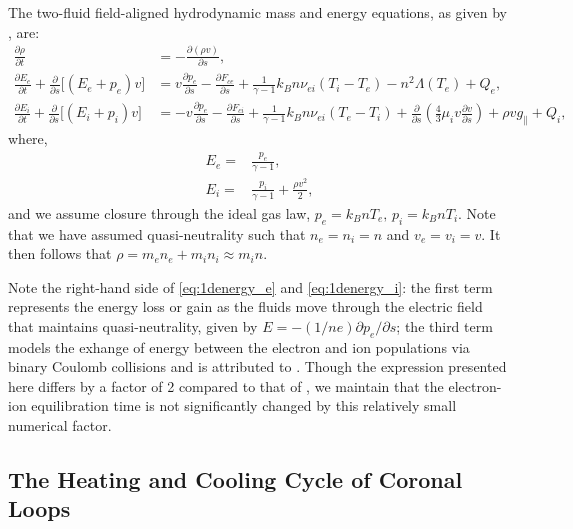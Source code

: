 

The two-fluid field-aligned hydrodynamic mass and energy equations, as given by \citet{bradshaw_influence_2013}, are:
\begin{align}
    \frac{\partial\rho}{\partial t} &= -\frac{\partial(\rho v)}{\partial s}, \label{eq:1dmass} \\
    \frac{\partial E_e}{\partial t} + \frac{\partial}{\partial s} \lbrack(E_e+p_e)v\rbrack &= v\frac{\partial p_e}{\partial s} - \frac{\partial F_{ce}}{\partial s} + \frac{1}{\gamma - 1}k_Bn\nu_{ei}(T_i-T_e) -n^2\Lambda(T_e)+Q_{e} , \label{eq:1denergy_e} \\
    \frac{\partial E_i}{\partial t} + \frac{\partial }{\partial s}\lbrack(E_i+p_i)v\rbrack &= -v\frac{\partial p_e}{\partial s} - \frac{\partial F_{ci}}{\partial s} + \frac{1}{\gamma - 1}k_Bn\nu_{ei}(T_e-T_i) + \frac{\partial}{\partial s}\left(\frac{4}{3}\mu_iv\frac{\partial v}{\partial s}\right) +\rho v g_{\parallel} + Q_{i},\label{eq:1denergy_i}
\end{align}
where,
\begin{align}
    E_e =& \frac{p_e}{\gamma - 1} \label{eq:ee_closure}, \\
    E_i =& \frac{p_i}{\gamma - 1} + \frac{\rho v^2}{2}, \label{eq:ei_closure}
\end{align}
and we assume closure through the ideal gas law, $p_e=k_BnT_e,\,p_i=k_BnT_i$. Note that we have assumed quasi-neutrality such that $n_e=n_i=n$ and $v_e=v_i=v$. It then follows that $\rho=m_en_e+m_in_i\approx m_in$.

Note the right-hand side of \autoref{eq:1denergy_e} and \autoref{eq:1denergy_i}: the first term represents the energy loss or gain as the fluids move through the electric field that maintains quasi-neutrality, given by $E=-(1/ne)\partial p_e/\partial s$; the third term models the exhange of energy between the electron and ion populations via binary Coulomb collisions and is attributed to \citet{braginskii_transport_1965}. Though the expression presented here differs by a factor of 2 compared to that of \citeauthor{braginskii_transport_1965}, we maintain that the electron-ion equilibration time is not significantly changed by this relatively small numerical factor.

\subsection{The Heating and Cooling Cycle of Coronal Loops}\label{sec:heating-cooling-cycle}

